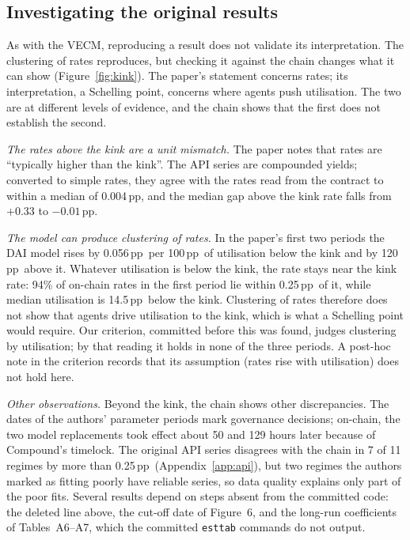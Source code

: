 \documentclass[11pt]{article}
\newcommand{\pp}{\,pp}
\begin{document}
\subsection{Investigating the original results}
\label{sec:investigation}

As with the VECM, reproducing a result does not validate its interpretation. The clustering of rates reproduces, but checking it against the chain changes what it can show (Figure~\ref{fig:kink}). The paper's statement concerns rates; its interpretation, a Schelling point, concerns where agents push utilisation. The two are at different levels of evidence, and the chain shows that the first does not establish the second.

\emph{The rates above the kink are a unit mismatch.} The paper notes that rates are ``typically higher than the kink''. The API series are compounded yields; converted to simple rates, they agree with the rates read from the contract to within a median of 0.004\pp, and the median gap above the kink rate falls from $+0.33$ to $-0.01$\pp.

\emph{The model can produce clustering of rates.} In the paper's first two periods the DAI model rises by 0.056\pp\ per 100\pp\ of utilisation below the kink and by 120\pp\ above it. Whatever utilisation is below the kink, the rate stays near the kink rate: 94\% of on-chain rates in the first period lie within 0.25\pp\ of it, while median utilisation is 14.5\pp\ below the kink. Clustering of rates therefore does not show that agents drive utilisation to the kink, which is what a Schelling point would require. Our criterion, committed before this was found, judges clustering by utilisation; by that reading it holds in none of the three periods. A post-hoc note in the criterion records that its assumption (rates rise with utilisation) does not hold here.

\emph{Other observations.} Beyond the kink, the chain shows other discrepancies. The dates of the authors' parameter periods mark governance decisions; on-chain, the two model replacements took effect about 50 and 129 hours later because of Compound's timelock. The original API series disagrees with the chain in 7 of 11 regimes by more than 0.25\pp\ (Appendix~\ref{app:api}), but two regimes the authors marked as fitting poorly have reliable series, so data quality explains only part of the poor fits. Several results depend on steps absent from the committed code: the deleted line above, the cut-off date of Figure~6, and the long-run coefficients of Tables~A6--A7, which the committed \texttt{esttab} commands do not output.
\end{document}
